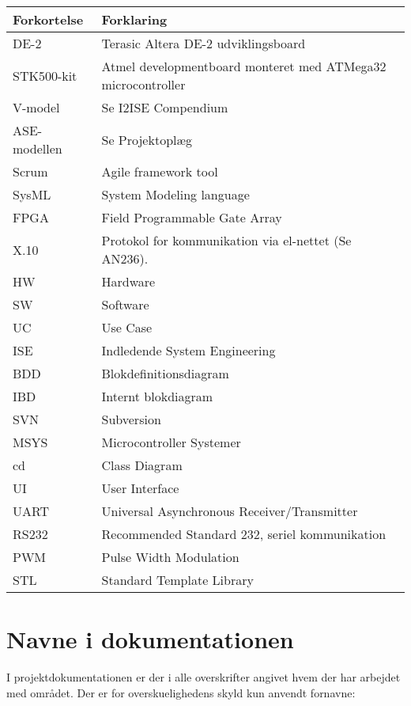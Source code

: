 \begin{table} [h]
	\centering
	\begin{tabular}{|l|l|}
	\hline
	\textbf{Forkortelse} & \textbf{Forklaring} \\ \hline
	DE-2 & Terasic Altera DE-2 udviklingsboard \\ \hline
	STK500-kit & Atmel developmentboard monteret med ATMega32 microcontroller \\ \hline 
	V-model & Se I2ISE Compendium \cite{lib:T-006}\\ \hline
	ASE-modellen & Se Projektoplæg \cite{lib:Projektoplaeg}\\ \hline
	Scrum & Agile framework tool  \\ \hline
	SysML & System Modeling language \cite{lib:T-006} \\ \hline
	FPGA & Field Programmable Gate Array \\ \hline
	X.10 & Protokol for kommunikation via el-nettet (Se AN236). \cite[s. 12]{lib:AN236} \\ \hline
	HW & Hardware \\ \hline
	SW & Software \\ \hline
	UC & Use Case \\ \hline
	ISE & Indledende System Engineering \\ \hline
	BDD & Blokdefinitionsdiagram \\ \hline
	IBD & Internt blokdiagram \\ \hline
	SVN & Subversion \\ \hline
	MSYS & Microcontroller Systemer \\ \hline
	cd & Class Diagram \\ \hline
	UI & User Interface \\ \hline
	UART & Universal Asynchronous Receiver/Transmitter \\ \hline
	RS232 & Recommended Standard 232, seriel kommunikation \\ \hline
	PWM & Pulse Width Modulation \\ \hline
	STL & Standard Template Library \\ \hline
	\end{tabular}
\end{table}
\clearpage
\section{Navne i dokumentationen}
I projektdokumentationen er der i alle overskrifter angivet hvem der har arbejdet med området. Der er for overskuelighedens skyld kun anvendt fornavne:

